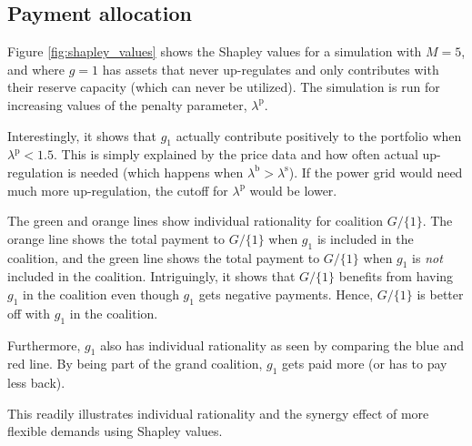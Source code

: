 \documentclass[conference]{IEEEtran}
\begin{document}
\subsection{Payment allocation}

Figure \ref{fig:shapley_values} shows the Shapley values for a simulation with $M = 5$, and where $g = 1$ has assets that never up-regulates and only contributes with their reserve capacity (which can never be utilized). The simulation is run for increasing values of the penalty parameter, $\lambda^{\text{p}}$.

Interestingly, it shows that $g_1$ actually contribute positively to the portfolio when $\lambda^{\text{p}} < 1.5$. This is simply explained by the price data and how often actual up-regulation is needed (which happens when $\lambda^{\text{b}} > \lambda^{\text{s}}$). If the power grid would need much more up-regulation, the cutoff for $\lambda^{\text{p}}$ would be lower.

The green and orange lines show individual rationality for coalition $G / \{1\}$. The orange line shows the total payment to $G / \{1\}$ when $g_1$ is included in the coalition, and the green line shows the total payment to $G / \{1\}$ when $g_1$ is \textit{not} included in the coalition. Intriguingly, it shows that $G / \{1\}$ benefits from having $g_1$ in the coalition even though $g_1$ gets negative payments. Hence, $G / \{1\}$ is better off with $g_1$ in the coalition.

Furthermore, $g_1$ also has individual rationality as seen by comparing the blue and red line. By being part of the grand coalition, $g_1$ gets paid more (or has to pay less back).

This readily illustrates individual rationality and the synergy effect of more flexible demands using Shapley values.
\end{document}
